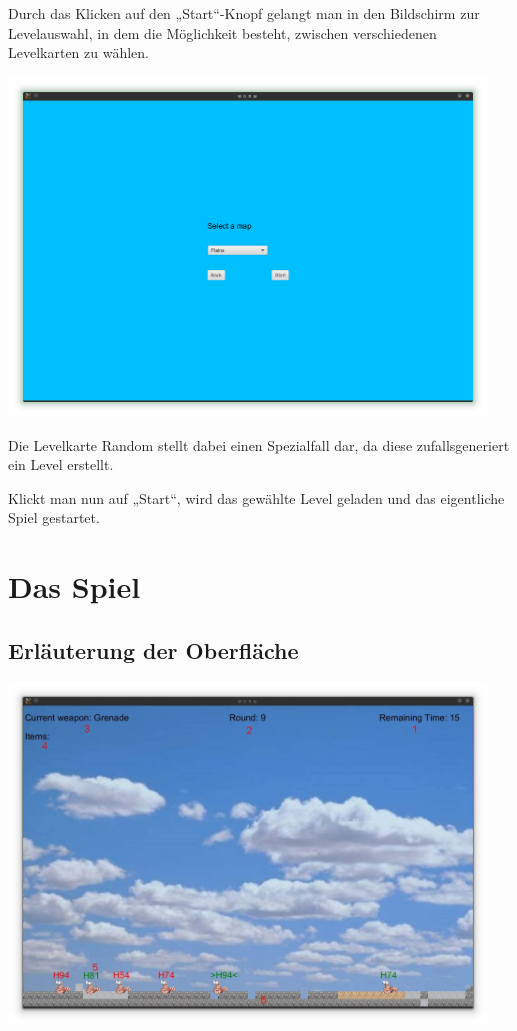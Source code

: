 \documentclass{scrreprt}
\begin{document}
Durch das Klicken auf den „Start“-Knopf gelangt man in den Bildschirm zur Levelauswahl, in dem die Mög\-lichkeit
besteht, zwischen verschiedenen Levelkarten zu wählen.

\includegraphics[height=9cm]{Screenshot7.png}

Die Levelkarte Random stellt dabei einen Spezialfall dar, da diese zufallsgeneriert ein Level erstellt.

Klickt man nun auf „Start“, wird das gewählte Level geladen und das eigentliche Spiel gestartet.

\section{Das Spiel}

\subsection{Erläuterung der Oberfläche}

\includegraphics[height=9cm]{Screenshot13.jpg}
\end{document}
